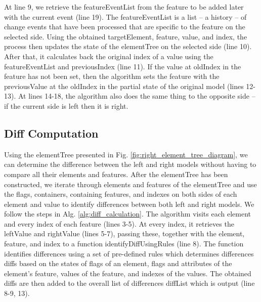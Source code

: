 \documentclass{jot}
\begin{document}
    At line 9, we retrieve the \textsf{featureEventList} from the \textsf{feature} to be added later with the current \textsf{event} (line 19). The \textsf{featureEventList} is a list -- a history -- of change events that have been processed that are specific to the \textsf{feature} on the selected \textsf{side}. Using the obtained \textsf{targetElement}, \textsf{feature}, \textsf{value}, and \textsf{index}, the process then updates the state of the \textsf{elementTree} on the selected \textsf{side} (line 10). After that, it calculates back the original index of a value using the \textsf{featureEventList} and \textsf{previousIndex} (line 11). If the value at \textsf{oldIndex} in the \textsf{feature} has not been set, then the algorithm sets the \textsf{feature} with the \textsf{previousValue} at the \textsf{oldIndex} in the partial state of the original model (lines 12-13). At lines 14-18, the algorithm also does the same thing to the opposite side -- if the current \textsf{side} is \textsf{left} then it is \textsf{right}.  
    
    \subsection{Diff Computation}
    \label{sec:diff_computation}
    
    Using the \textsf{elementTree} presented in Fig. \ref{fig:right_element_tree_diagram}, we can determine the difference between the left and right models without having to compare all their elements and features. After the \textsf{elementTree} has been constructed, we iterate through elements and features of the \textsf{elementTree} and use the flags, containers, containing features, and indexes on both sides of each element and value to identify differences between both left and right models. We follow the steps in Alg. \ref{alg:diff_calculation}. The algorithm visits each element and every index of each feature (lines 3-5). At every index, it retrieves the \textsf{leftValue} and \textsf{rightValue} (lines 5-7), passing these, together with the \textsf{element}, \textsf{feature}, and \textsf{index} to a function \textsf{identifyDiffUsingRules} (line 8). The function identifies differences using a set of pre-defined rules which determines differences \textsf{diffs} based on the states of flags of an element, flags and attributes of the element's feature, values of the feature, and indexes of the values. The obtained \textsf{diffs} are then added to the overall list of differences \textsf{diffList} which is output (line 8-9, 13). 
    
\end{document}
